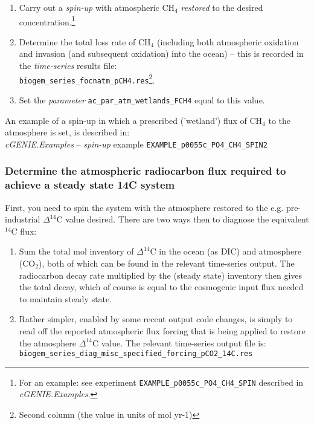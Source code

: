 \documentclass[11pt,fleqn]{book} %
\begin{document}
\begin{enumerate}[noitemsep]

\vspace{1mm}
        \item Carry out a \textit{spin-up} with atmospheric CH\(_{4}\) \textit{restored} to the desired concentration.\footnote{For an example: see experiment \texttt{EXAMPLE\_p0055c\_PO4\_CH4\_SPIN} described in \textit{cGENIE.Examples}.}

\vspace{1mm}
        \item Determine the total loss rate of CH\(_{4}\) (including both atmospheric oxidation and invasion (and subsequent oxidation) into the ocean) -- this is recorded in the \textit{time-series} results file:\\ \texttt{biogem\_series\_focnatm\_pCH4.res}\footnote{Second column (the value in units of mol yr-1)}.

\vspace{1mm}
        \item Set the \textit{parameter} \texttt{ac\_par\_atm\_wetlands\_FCH4} equal to this value.
\end{enumerate}

An example of a spin-up in which a prescribed ('wetland') flux of CH\(_{4}\) to the atmosphere is set, is described in:\\ \textit{cGENIE.Examples} -- \textit{spin-up} example \texttt{EXAMPLE\_p0055c\_PO4\_CH4\_SPIN2}

%
\subsubsection{Determine the atmospheric radiocarbon flux required to achieve a steady state 14C system}
\vspace{1mm}

First, you need to spin the system with the atmosphere restored to the e.g. pre-industrial \(\Delta^{14}\)C value desired. There are two ways then to diagnose the equivalent \(^{14}\)C flux:

\begin{enumerate}[noitemsep]

\vspace{1mm}
\item Sum the total mol inventory of \(\Delta^{14}\)C in the ocean (as DIC) and atmosphere (CO\(_{2}\)), both of which can be found in the relevant time-series output. The radiocarbon decay rate multiplied by the (steady state) inventory then gives the total decay, which of course is equal to the cosmogenic input flux needed to maintain steady state.

\vspace{1mm}
\item Rather simpler, enabled by some recent output code changes, is simply to read off the reported atmospheric flux forcing that is being applied to restore the atmosphere \(\Delta^{14}\)C value. The relevant time-series output file is:
\\\texttt{biogem\_series\_diag\_misc\_specified\_forcing\_pCO2\_14C.res}

\end{enumerate}
\end{document}
